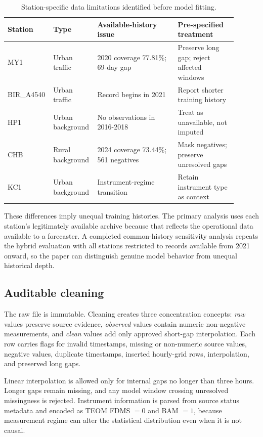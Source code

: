 \documentclass[sn-mathphys-num]{sn-jnl}
\begin{document}
\begin{table}[tbp]
\centering
\caption{Station-specific data limitations identified before model fitting.}
\label{tab:station-quality}
\footnotesize
\begin{tabular}{p{0.13\linewidth}p{0.18\linewidth}p{0.34\linewidth}p{0.25\linewidth}}
\toprule
Station & Type & Available-history issue & Pre-specified treatment \\
\midrule
MY1 & Urban traffic & 2020 coverage 77.81\%; 69-day gap & Preserve long gap; reject affected windows \\
BIR\_A4540 & Urban traffic & Record begins in 2021 & Report shorter training history \\
HP1 & Urban background & No observations in 2016-2018 & Treat as unavailable, not imputed \\
CHB & Rural background & 2024 coverage 73.44\%; 561 negatives & Mask negatives; preserve unresolved gaps \\
KC1 & Urban background & Instrument-regime transition & Retain instrument type as context \\
\bottomrule
\end{tabular}
\end{table}

These differences imply unequal training histories. The primary analysis uses
each station's legitimately available archive because that reflects the
operational data available to a forecaster. A completed common-history
sensitivity analysis repeats the hybrid evaluation with all stations restricted
to records available from 2021 onward, so the paper can distinguish genuine
model behavior from unequal historical depth.

\subsection{Auditable cleaning}
\label{sec:cleaning}

The raw file is immutable. Cleaning creates three concentration concepts:
\emph{raw} values preserve source evidence, \emph{observed} values contain
numeric non-negative measurements, and \emph{clean} values add only approved
short-gap interpolation. Each row carries flags for invalid timestamps,
missing or non-numeric source values, negative values, duplicate timestamps,
inserted hourly-grid rows, interpolation, and preserved long gaps.

Linear interpolation is allowed only for internal gaps no longer than three
hours. Longer gaps remain missing, and any model window crossing unresolved
missingness is rejected. Instrument information is parsed from source status
metadata and encoded as TEOM FDMS \(=0\) and BAM \(=1\), because measurement
regime can alter the statistical distribution even when it is not causal.
\end{document}

